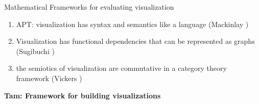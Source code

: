 \documentclass[xcolor={dvipsnames}, handout]{beamer}
\begin{document}
\begin{frame}{Mathematical Frameworks for evaluating visualization}
    \begin{enumerate}
        \item APT: visualization has syntax and semantics like a language  (Mackinlay  \cite{mackinlayAutomatingDesignGraphical1986, mackinlayAUTOMATICDESIGNGRAPHICAL1987})
        \item Visualization has functional dependencies that can be represented as graphs (Sugibuchi \cite{sugibuchiFramwork2009}) 
        \item the semiotics of visualization are commutative in a category theory framework (Vickers \cite{vickersUnderstandingViz2013})
    \end{enumerate}
    \pause
    \begin{center}
        \textbf{Tam: Framework for building visualizations}
    \end{center}
\end{frame}
\end{document}
